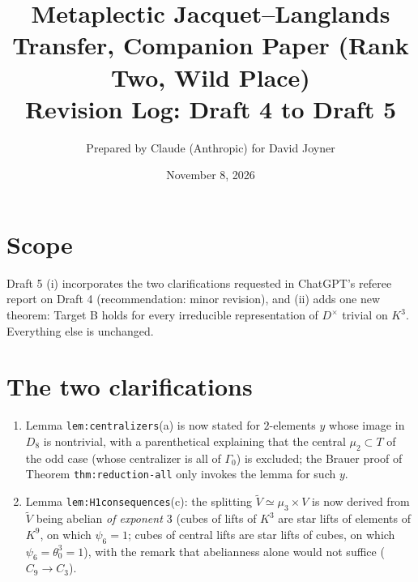 \documentclass[11pt]{article}
\title{Metaplectic Jacquet--Langlands Transfer, Companion Paper (Rank Two, Wild Place)\\Revision Log: Draft 4 to Draft 5}
\author{Prepared by Claude (Anthropic) for David Joyner}
\date{November 8, 2026}
\begin{document}
\maketitle
\section*{Scope}
Draft 5 (i) incorporates the two clarifications requested in ChatGPT's
referee report on Draft 4 (recommendation: minor revision), and (ii) adds
one new theorem: Target B holds for every irreducible representation of
$D^\times$ trivial on $K^3$.  Everything else is unchanged.

\section*{The two clarifications}
\begin{enumerate}[leftmargin=*]
\item Lemma \texttt{lem:centralizers}(a) is now stated for $2$-elements
$y$ whose image in $D_8$ is nontrivial, with a parenthetical explaining
that the central $\mu_2\subset T$ of the odd case (whose centralizer is
all of $\Gamma_0$) is excluded; the Brauer proof of Theorem
\texttt{thm:reduction-all} only invokes the lemma for such $y$.
\item Lemma \texttt{lem:H1consequences}(c): the splitting
$\tilde V\simeq\mu_3\times V$ is now derived from $\tilde V$ being
abelian \emph{of exponent $3$} (cubes of lifts of $K^3$ are star lifts
of elements of $K^9$, on which $\psi_6=1$; cubes of central lifts are
star lifts of cubes, on which $\psi_6=\theta_0^3=1$), with the remark
that abelianness alone would not suffice ($C_9\to C_3$).
\end{enumerate}
\end{document}
